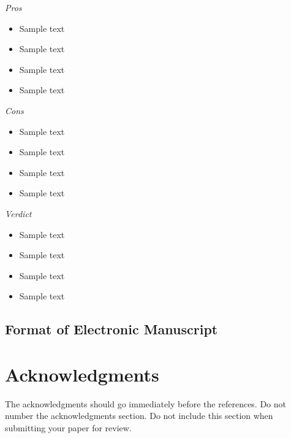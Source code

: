 \documentclass[11pt]{article}
\begin{document}
\emph{Pros}
\begin{itemize}
  \setlength{\itemsep}{0mm}  
  \item Sample text
  \item Sample text
  \item Sample text
  \item Sample text
\end{itemize}
\par
\emph{Cons}
\begin{itemize}
  \setlength{\itemsep}{0mm}  
  \item Sample text
  \item Sample text
  \item Sample text
  \item Sample text
\end{itemize}
\par
\emph{Verdict}
\begin{itemize}
  \setlength{\itemsep}{0mm}  
  \item Sample text
  \item Sample text
  \item Sample text
  \item Sample text
\end{itemize}

\subsection{Format of Electronic Manuscript}
\label{sect:pdf}





\section*{Acknowledgments}

The acknowledgments should go immediately before the references.  Do
not number the acknowledgments section. Do not include this section
when submitting your paper for review.

%
%




\printbibliography
\end{document}
